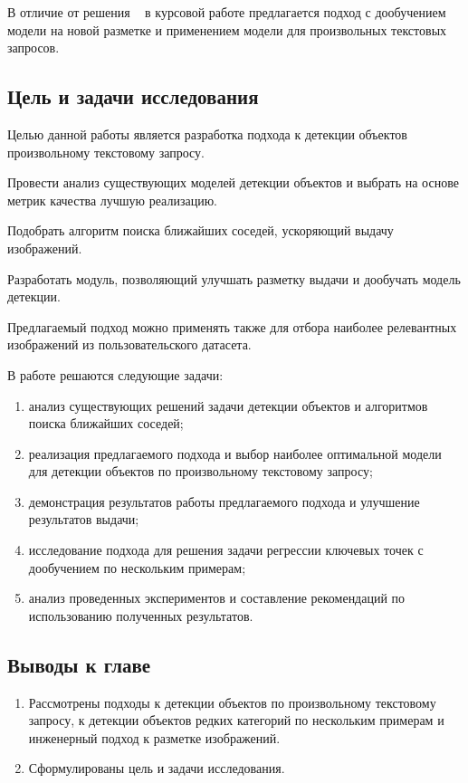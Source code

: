 \documentclass[a4paper,14pt]{article}
\begin{document}
    В отличие от решения ~\cite{AnnoMage} в курсовой работе предлагается подход с дообучением модели на новой разметке и применением модели для произвольных текстовых запросов.

    \subsection{Цель и задачи исследования}
    
    Целью данной работы является разработка подхода к детекции объектов произвольному текстовому запросу.
    
    Провести анализ существующих моделей детекции объектов и выбрать на основе метрик качества лучшую реализацию.
    
    Подобрать алгоритм поиска ближайших соседей, ускоряющий выдачу изображений.
    
    Разработать модуль, позволяющий улучшать разметку выдачи и дообучать модель детекции.
    
    Предлагаемый подход можно применять также для отбора наиболее релевантных изображений из пользовательского датасета.

    В работе решаются следующие задачи:
    \begin{enumerate}
        [1)]
        \itemsep0em
        \item анализ существующих решений задачи детекции объектов и алгоритмов поиска ближайших соседей;
        \item реализация предлагаемого подхода и выбор наиболее оптимальной модели для детекции объектов по произвольному текстовому запросу;
        \item демонстрация результатов работы предлагаемого подхода и улучшение результатов выдачи;
        \item исследование подхода для решения задачи регрессии ключевых точек с дообучением по нескольким примерам;
        \item анализ проведенных экспериментов и составление рекомендаций по использованию полученных результатов.
    \end{enumerate}

    \subsection{Выводы к главе \thesection}
    \begin{enumerate}
        \itemsep0em
        \item Рассмотрены подходы к детекции объектов по произвольному текстовому запросу, к детекции объектов редких категорий по нескольким примерам и инженерный подход к разметке изображений.
        \item Сформулированы цель и задачи исследования.
    \end{enumerate}
\end{document}
